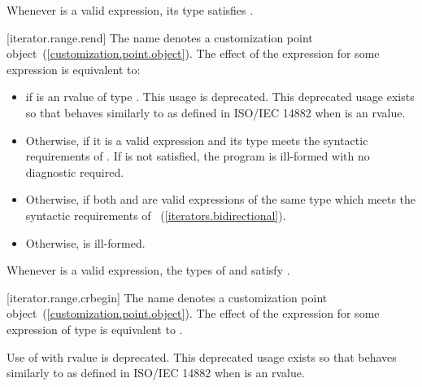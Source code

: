 \pnum
\enternote Whenever  is a valid expression, its
type satisfies . \exitnote

[iterator.range.rend]{}
\pnum
The name  denotes a customization point
object~(\ref{customization.point.object}). The effect of the expression
 for some expression  is equivalent to:

\begin{itemize}
\item
   if  is an rvalue of
  type . This usage is deprecated.
  \enternote This deprecated usage exists so that
   behaves similarly to 
  as defined in ISO/IEC 14882 when  is an rvalue. \exitnote

\item
  Otherwise,  if it is a valid expression and its type  meets the
  syntactic requirements of
  . If
   is not satisfied, the program is ill-formed with
  no diagnostic required.

\item
  Otherwise,  if both
   and  are valid expressions of the same
  type  which meets the syntactic requirements of
  ~(\ref{iterators.bidirectional}).

\item
  Otherwise,  is ill-formed.
\end{itemize}

\pnum
\enternote Whenever  is a valid expression, the
types of  and  satisfy
. \exitnote

[iterator.range.crbegin]{}
\pnum
The name  denotes a customization point
object~(\ref{customization.point.object}). The effect of the expression
 for some expression  of type 
is equivalent to .

\pnum
Use of  with rvalue  is deprecated.
\enternote This deprecated usage exists so that 
behaves similarly to  as defined in ISO/IEC 14882 when
 is an rvalue. \exitnote

